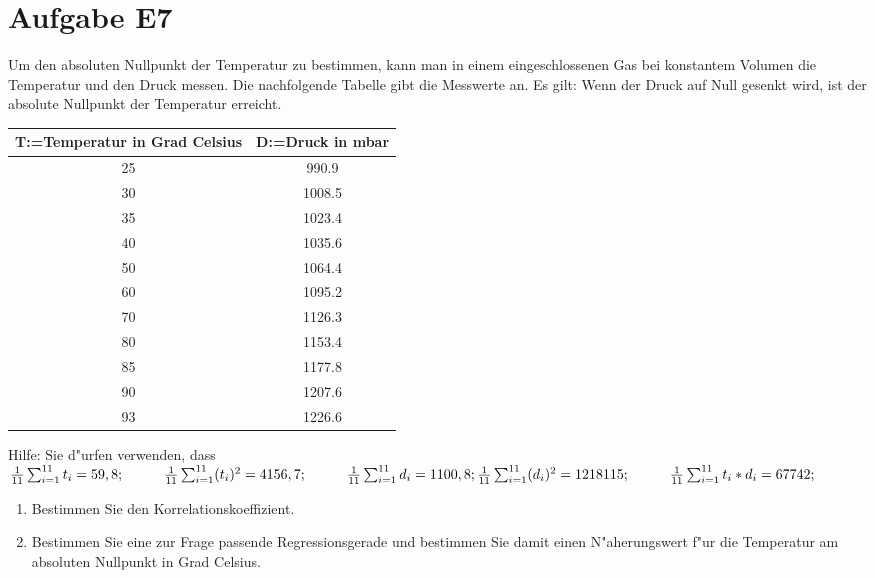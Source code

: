 \section{Aufgabe E7}
Um den absoluten Nullpunkt der Temperatur zu bestimmen, kann man in einem eingeschlossenen Gas bei
konstantem Volumen die Temperatur und den Druck messen. Die nachfolgende Tabelle gibt die Messwerte
an. Es gilt: Wenn der Druck auf Null gesenkt wird, ist der absolute Nullpunkt der Temperatur erreicht.
\newline

\begin{center}
\begin{tabular}{|c|c|}
\hline  T:=Temperatur in Grad Celsius&  D:=Druck in mbar	\\ 
\hline  			25&						990.9		  	\\ 
\hline  			30&  					1008.5			\\ 
\hline  			35&  					1023.4			\\ 
\hline  			40&  					1035.6			\\ 
\hline  			50&  					1064.4			\\ 
\hline  			60&  					1095.2			\\ 
\hline  			70&  					1126.3			\\ 
\hline  			80&  					1153.4			\\ 
\hline  			85&  					1177.8			\\ 
\hline  			90&  					1207.6			\\ 
\hline  			93&  					1226.6			\\ 
\hline 
\end{tabular} 
\end{center}
Hilfe: Sie d"urfen verwenden, dass
\newline
\newline
$	\frac{1}{11}\sum _{i=1}^{11}{t}_{i}=59,8; 
	\hspace{1cm}
	\frac{1}{11}\sum _{i=1}^{11}({t}_{i})^2=4156,7;
	\hspace{1cm} 
	\frac{1}{11}\sum _{i=1}^{11}{d}_{i}=1100,8; 
	\newline
	\newline
	\frac{1}{11}\sum _{i=1}^{11}({d}_{i})^2=1218115; 
	\hspace{1cm}
	\frac{1}{11}\sum _{i=1}^{11}{t}_{i}*{d}_{i}=67742; 
$

\begin{enumerate}[leftmargin=1cm, label=\alph*)]
\item Bestimmen Sie den Korrelationskoeffizient.
\newpage

\item Bestimmen Sie eine zur Frage passende Regressionsgerade und bestimmen Sie damit einen N"aherungswert f"ur die Temperatur am absoluten Nullpunkt in Grad Celsius.
\end{enumerate}

